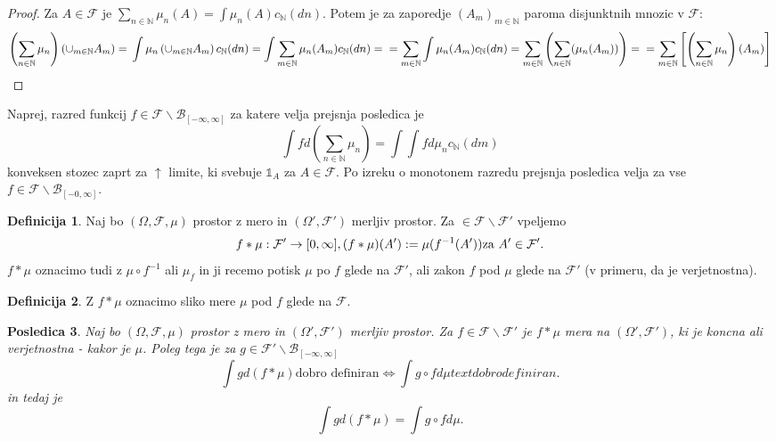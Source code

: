 \documentclass[a4paper,12pt]{article}
\theoremstyle{definition} %
\newtheorem{definicija}{Definicija}[section]
\theoremstyle{plain} %
\newtheorem{posledica}[definicija]{Posledica}
\newcommand{\N}{\mathbb{N}}
\newcommand{\F}{\mathcal{F}}
\begin{document}
            \begin{proof}
                Za $A \in \F$ je $\sum_{n \in \N}\mu_n(A) = \int \mu_n(A)c_\N(dn)$. Potem je za zaporedje $(A_m)_{m \in \N}$
                paroma disjunktnih mnozic v $\F$:
                $$
                    \left( \sum_{n \in \N}\mu_n \right)\left(\cup_{m \in \N}A_m\right) = \\
                    \int \mu_n \left(\cup_{m \in \N}A_m\right)c_\N(dn) = \int \sum_{m \in \N}\mu_n(A_m)c_\N(dn) =\\
                    = \sum_{m \in \N} \int \mu_n(A_m)c_\N(dn) = \sum_{m \in \N}\left(\sum_{n\in \N}(\mu_n(A_m))\right) = \\
                    = \sum_{m \in \N}\left[\left(\sum_{n\in\N}\mu_n\right)(A_m)\right]
                $$
            \end{proof}

            Naprej, razred funkcij $f \in \F\backslash\mathcal{B}_{[-\infty, \infty]}$ za katere velja prejsnja posledica je
            $$
                \int f d\left(\sum_{n\in\N}\mu_n\right) = \int \int f d\mu_n c_\N(dm)
            $$
            konveksen stozec zaprt za $\uparrow$ limite, ki svebuje $\mathds{1}_A$ za $A \in \F$.
            Po izreku o monotonem razredu prejsnja posledica velja za vse $f \in \F\backslash\mathcal{B}_{[-0, \infty]}$.

            \begin{definicija}
                Naj bo $(\Omega, \F, \mu)$ prostor z mero in $(\Omega', \F')$ merljiv prostor. Za $ \in \F\backslash\F'$ vpeljemo
                $$
                    f * \mu: \F' \rightarrow [0, \infty], \\
                    (f*\mu)(A') := \mu(f^{-1}(A')) \text{za $A'\in \F'$}.
                $$
                $f*\mu$ oznacimo tudi z $\mu \circ f^{-1}$ ali $\mu_{f}$ in ji recemo potisk $\mu$ po $f$ glede na $\F'$, ali 
                zakon $f$ pod $\mu$ glede na $\F'$ (v primeru, da je verjetnostna).
            \end{definicija}

            \begin{definicija}
                Z $f*\mu$ oznacimo sliko mere $\mu$ pod $f$ glede na $\F$.
            \end{definicija}

            \begin{posledica}
                Naj bo $(\Omega, \F, \mu)$ prostor z mero in $(\Omega', \F')$ merljiv prostor. Za $f \in \F\backslash\F'$ je
                $f*\mu$ mera na $(\Omega', \F')$, ki je koncna ali verjetnostna - kakor je $\mu$. Poleg tega je za $g \in \F'\backslash\mathcal{B}_{[-\infty, \infty]}$
                $$
                    \int g d(f*\mu) \text{dobro definiran} \iff \int g \circ f d\mu text{dobro definiran}.
                $$
                in tedaj je 
                $$
                    \int g d(f*\mu) = \int g \circ f d\mu.
                $$
            \end{posledica}
\end{document}
